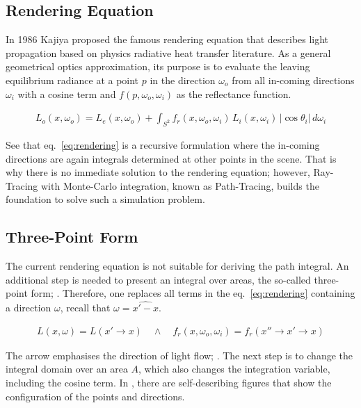 \subsection{Rendering Equation}

In 1986 Kajiya \cite{kajiya_rendering_1986} proposed the famous rendering equation that describes light propagation based on physics radiative heat transfer literature.
As a general geometrical optics approximation, its purpose is to evaluate the leaving equilibrium radiance at a point $p$ in the direction $\omega_o$ from all in-coming directions $\omega_i$ with a cosine term and $f(p, \omega_o, \omega_i)$ as the reflectance function.

\begin{align}
L_o(x,\omega_o)=L_e(x,\omega_o)+\int_{S^2}f_r(x,\omega_o,\omega_i)\,L_i(x,\omega_i)\,\left|\cos\theta_i\right|\,d\omega_i
\label{eq:rendering}
\end{align}

See that eq.~\ref{eq:rendering} is a recursive formulation where the in-coming directions are again integrals determined at other points in the scene.
That is why there is no immediate solution to the rendering equation; however, Ray-Tracing with Monte-Carlo integration, known as Path-Tracing, builds the foundation to solve such a simulation problem.

\subsection{Three-Point Form}

The current rendering equation is not suitable for deriving the path integral.
An additional step is needed to present an integral over areas, the so-called three-point form; \cite{veach_robust_1997}.
Therefore, one replaces all terms in the eq.~\ref{eq:rendering} containing a direction $\omega$, recall that $\omega=\widehat{x'-x}$.

\begin{align*}
L(x,\omega)=L(x'\rightarrow x)\quad\wedge\quad f_r(x,\omega_o,\omega_i)=f_r(x''\rightarrow x'\rightarrow x)
\end{align*}

The arrow emphasises the direction of light flow; \cite{veach_robust_1997}.
The next step is to change the integral domain over an area $A$, which also changes the integration variable, including the cosine term.
In \cite{kajiya_rendering_1986}, there are self-describing figures that show the configuration of the points and directions.

